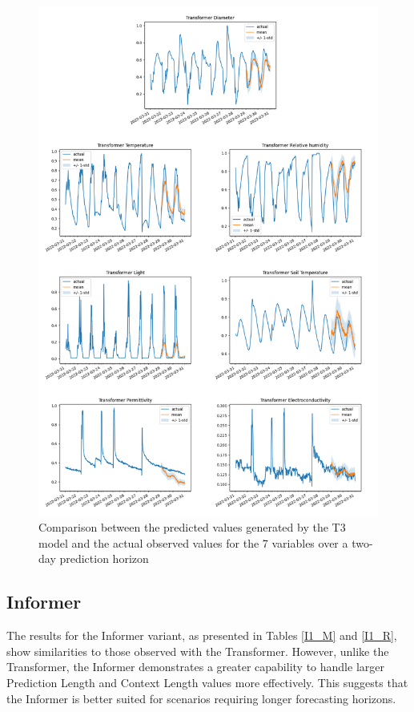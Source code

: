 \begin{figure}[htbp]
    \centering
    \includegraphics[width=15 cm]{6_ChapterResults/figuras/T3.png}
    \caption{Comparison between the predicted values generated by the T3 model and the actual observed values for the 7 variables over a two-day prediction horizon}
    \label{T3}
\end{figure}

\subsection{Informer}
The results for the Informer variant, as presented in Tables \ref{I1_M} and \ref{I1_R}, show similarities to those observed with the Transformer. However, unlike the Transformer, the Informer demonstrates a greater capability to handle larger Prediction Length and Context Length values more effectively. This suggests that the Informer is better suited for scenarios requiring longer forecasting horizons.

